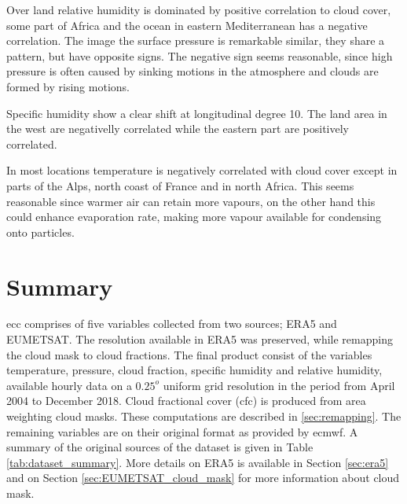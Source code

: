 Over land relative humidity is dominated by positive correlation to cloud cover, some part of Africa and the ocean in eastern Mediterranean has a negative correlation. The image the surface pressure is remarkable similar, they share a pattern, but have opposite signs. The negative sign seems reasonable, since high pressure is often caused by sinking motions in the atmosphere and clouds are formed by rising motions. 

Specific humidity show a clear shift at longitudinal degree 10. The land area in the west are negativelly correlated while the eastern part are positively correlated. 

In most locations temperature is negatively correlated with cloud cover except in parts of the Alps, north coast of France and in north Africa. This seems reasonable since warmer air can retain more vapours, on the other hand this could enhance evaporation rate, making more vapour available for condensing onto particles. 


\section{Summary}
\acrshort{ecc} comprises of five variables collected from two sources; ERA5 and EUMETSAT. The resolution available in ERA5 was preserved, while remapping the cloud mask to cloud fractions. The final product consist of the variables temperature, pressure, cloud fraction, specific humidity and relative humidity, available hourly data on a $0.25^o$ uniform grid resolution in the period from April 2004 to December 2018. Cloud fractional cover (\acrshort{cfc}) is produced from area weighting cloud masks. These computations are described in \ref{sec:remapping}. The remaining variables are on their original format as provided by \acrfull{ecmwf}. A summary of the original sources of the dataset is given in Table \ref{tab:dataset_summary}. More details on ERA5 is available in Section \ref{sec:era5} and on Section \ref{sec:EUMETSAT_cloud_mask} for more information about cloud mask. 


